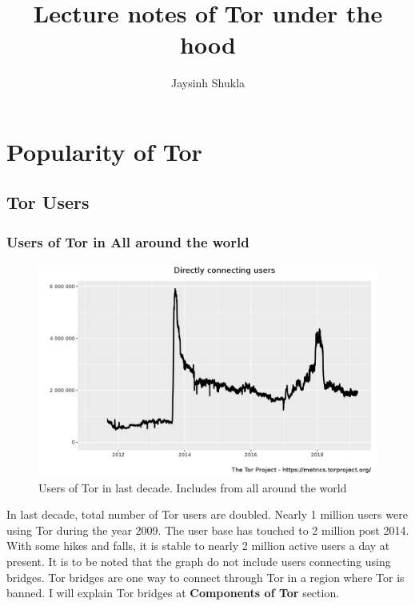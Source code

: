 \documentclass{article}
\title{Lecture notes of Tor under the hood}
\author{Jaysinh Shukla}
\begin{document}
\maketitle

\section{Popularity of Tor}

  \subsection{Tor Users}

    \subsubsection{Users of Tor in All around the world}
      \begin{figure}[h!]
        \includegraphics[width=\linewidth]{userstats-relay-country-all-last-decade.png}
        \caption{Users of Tor in last decade. Includes from all around the world}
        \label{fig:users_of_tor_from_all_around_the_world_last_decade}
      \end{figure}

      In last decade, total number of Tor users are doubled. Nearly 1 million
      users were using Tor during the year 2009. The user base has touched to 2
      million post 2014. With some hikes and falls, it is stable to nearly 2
      million active users a day at present. It is to be noted that the graph do
      not include users connecting using bridges. Tor bridges are one way to
      connect through Tor in a region where Tor is banned. I will explain Tor
      bridges at \textbf{Components of Tor} section.
\end{document}
